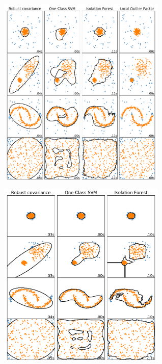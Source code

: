 \documentclass[slidetop,11pt]{beamer}
\begin{document}
\begin{frame}[plain]
    
\begin{center}
\includegraphics[width=8cm]{img/anomaly_comparison.pdf}
\end{center}

\end{frame}


\begin{frame}[plain]
    
\begin{center}
\includegraphics[width=8cm]{img/novelty_comparison.pdf}
\end{center}

\end{frame}
\end{document}
